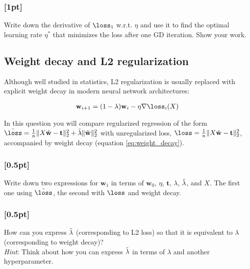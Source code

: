          \subsubsection{{\color{blue}[1pt]} \LII} 
         Write down the derivative of $\loss_1$ w.r.t. $\eta$ and use it to find the optimal learning rate $\eta^*$ that minimizes the loss after one GD iteration. Show your work.

    \subsection{Weight decay and L2 regularization}
    Although well studied in statistics, L2 regularization is usually replaced with explicit weight decay in modern neural network architectures: 
    
    \begin{align}
        \mathbf{w}_{i+1} = (1 - \lambda)\mathbf{w}_{i} - \eta \nabla \loss_i(X)
        \label{eq:weight_decay}
    \end{align}
    
    In this question you will compare regularized regression of the form $\Tilde{\loss} = \frac{1}{n}\| X \hat{\mathbf{w}} - \mathbf{t} \|_2^2 + \Tilde{\lambda} \|\hat{\mathbf{w}}\|_2^2$ with unregularized loss, $\loss = \frac{1}{n}\| X \hat{\mathbf{w}} - \mathbf{t} \|_2^2$, accompanied by weight decay (equation \ref{eq:weight_decay}).
    
    \subsubsection{{\color{blue}[0.5pt]} \LIII} 
    Write down two expressions for $\mathbf{w}_1$ in terms of $\mathbf{w}_0$, $\eta$, $\mathbf{t}$, $\lambda$, $\Tilde{\lambda}$, and $X$. The first one using $\Tilde{\loss}$, the second with $\loss$ and weight decay.\\

    \subsubsection{{\color{blue}[0.5pt]} \LIII}

    How can you express $\Tilde{\lambda}$ (corresponding to L2 loss) so that it is equivalent to $\lambda$ (corresponding to weight decay)? \\ \textit{Hint}: Think about how you can express $\Tilde{\lambda}$ in terms of $\lambda$ and another hyperparameter.\\

